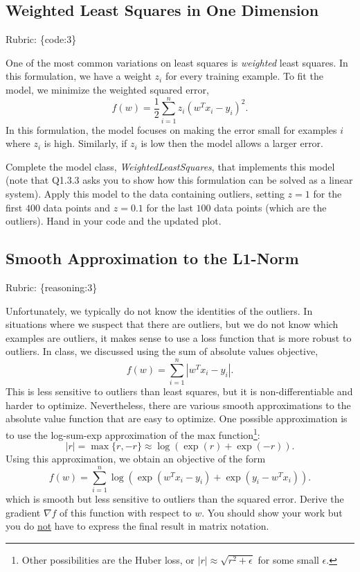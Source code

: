 \documentclass{article}
\def\rubric#1{\gre{Rubric: \{#1\}}}{}
\def\blu#1{{\color{blu}#1}}
\def\gre#1{{\color{gre}#1}}
\begin{document}
\subsection{Weighted Least Squares in One Dimension}
\rubric{code:3}

One of the most common variations on least squares is \emph{weighted} least squares. In this formulation, we have a weight $z_i$ for every training example. To fit the model, we minimize the weighted squared error,
\[
f(w) =  \frac{1}{2}\sum_{i=1}^n z_i(w^Tx_i - y_i)^2.
\]
In this formulation, the model focuses on making the error small for examples $i$ where $z_i$ is high. Similarly, if $z_i$ is low then the model allows a larger error.

Complete the model class, \emph{WeightedLeastSquares}, that implements this model
(note that Q1.3.3 asks you to show how this formulation can be solved as a linear system).
Apply this model to the data containing outliers, setting $z = 1$ for the first
$400$ data points and $z = 0.1$ for the last $100$ data points (which are the outliers).
\blu{Hand in your code and the updated plot}.

\subsection{Smooth Approximation to the L1-Norm}
\rubric{reasoning:3}

Unfortunately, we typically do not know the identities of the outliers. In situations where we suspect that there are outliers, but we do not know which examples are outliers, it makes sense to use a loss function that is more robust to outliers. In class, we discussed using the sum of absolute values objective,
\[
f(w) = \sum_{i=1}^n |w^Tx_i - y_i|.
\]
This is less sensitive to outliers than least squares, but it is non-differentiable and harder to optimize. Nevertheless, there are various smooth approximations to the absolute value function that are easy to optimize. One possible approximation is to use the log-sum-exp approximation of the max function\footnote{Other possibilities are the Huber loss, or $|r|\approx \sqrt{r^2+\epsilon}$ for some small $\epsilon$.}:
\[
|r| = \max\{r, -r\} \approx \log(\exp(r) + \exp(-r)).
\]
Using this approximation, we obtain an objective of the form
\[
f(w) {=} \sum_{i=1}^n  \log\left(\exp(w^Tx_i - y_i) + \exp(y_i - w^Tx_i)\right).
\]
which is smooth but less sensitive to outliers than the squared error. \blu{Derive
 the gradient $\nabla f$ of this function with respect to $w$. You should show your work but you do \underline{not} have to express the final result in matrix notation.}
\end{document}
